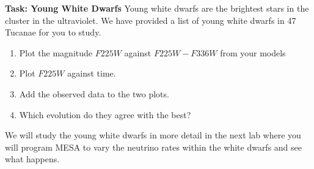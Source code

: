 \documentclass{article}
\begin{document}

\textbf{Task: Young White Dwarfs}
Young white dwarfs are the brightest stars in the cluster in the ultraviolet.  We have provided a list of young white dwarfs in 47 Tucanae for you to study.
\begin{enumerate}
 \setlength\itemsep{0em}
\item Plot the magnitude $F225W$ against $F225W-F336W$ from your models
\item Plot $F225W$ against time.
\item Add the observed  data to the two plots.  
\item Which evolution do they agree with the best?
\end{enumerate}


We will study the young white dwarfs in more detail in the next lab where you will program MESA to vary the neutrino rates within the white dwarfs and see what happens.
\end{document}

